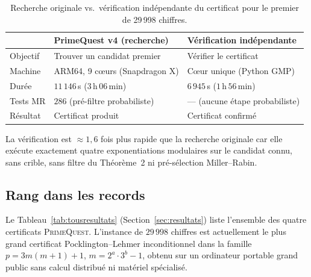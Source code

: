 \begin{table}[h]
\centering
\caption{Recherche originale vs.\ vérification indépendante du certificat
         pour le premier de 29\,998 chiffres.}
\label{tab:comparaison29998}
\renewcommand{\arraystretch}{1.3}
\begin{tabular}{@{}lll@{}}
\toprule
 & \textbf{PrimeQuest v4 (recherche)} & \textbf{Vérification indépendante} \\
\midrule
Objectif       & Trouver un candidat premier         & Vérifier le certificat \\
Machine        & ARM64, 9 cœurs (Snapdragon X)       & Cœur unique (Python GMP) \\
Durée          & $11\,146$\,s ($3$\,h\,$06$\,min)   & $6\,945$\,s ($1$\,h\,$56$\,min) \\
Tests MR       & $286$ (pré-filtre probabiliste)     & — (aucune étape probabiliste) \\
Résultat       & Certificat produit                  & Certificat confirmé \\
\bottomrule
\end{tabular}
\end{table}

La vérification est $\approx 1{,}6$ fois plus rapide que la recherche
originale car elle exécute exactement quatre exponentiations modulaires sur
le candidat connu, sans crible, sans filtre du Théorème~2 ni
pré-sélection Miller–Rabin.

\subsection{Rang dans les records}

Le Tableau~\ref{tab:tousresultats} (Section~\ref{sec:resultats}) liste
l'ensemble des quatre certificats \textsc{PrimeQuest}. L'instance de
$29\,998$ chiffres est actuellement le plus grand certificat
Pocklington–Lehmer inconditionnel dans la famille
$p = 3m(m+1)+1$, $m = 2^a\cdot 3^b - 1$,
obtenu sur un ordinateur portable grand public sans calcul distribué ni
matériel spécialisé.

